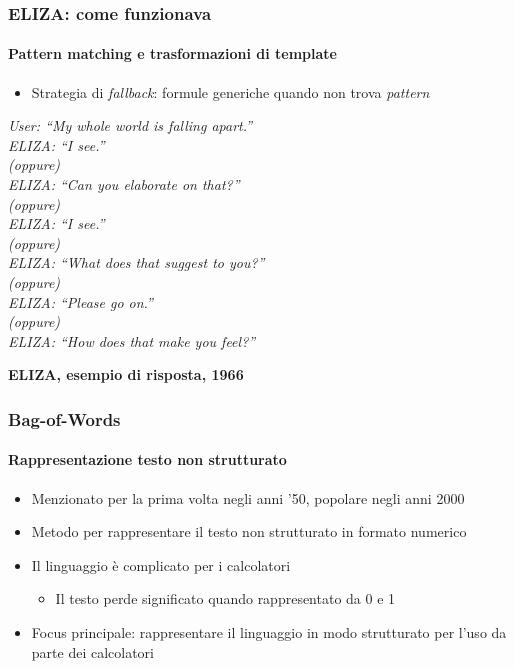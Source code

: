 \begin{frame}[t,fragile] \frametitle{ELIZA: come funzionava}
	\framesubtitle{Pattern matching e trasformazioni di template}
	{\small
		\begin{itemize}[leftmargin=10pt,align=right]
			\item[\alert{\faHandORight}] \alert{Strategia di \textit{fallback}:} formule generiche quando non trova \textit{pattern}
		\end{itemize}
		\vspace*{.3cm}
		\hspace*{4cm}
		\begin{minipage}[t]{.6\textwidth}
			\renewcommand{\epigraphsize}{\scriptsize}
			\setlength{\afterepigraphskip}{0pt}
			\setlength{\beforeepigraphskip}{5pt}
			\setlength{\epigraphwidth}{0.9\textwidth}
			\epigraph{\textit{\alert{User:} ``\alert{My} whole world is falling apart.''\\
			\alert{ELIZA:} ``I see.''\\
			(oppure)\\
			\alert{ELIZA:} ``Can you elaborate on that?''\\
			(oppure)\\
			\alert{ELIZA:} ``I see.''\\
			(oppure)\\
			\alert{ELIZA:} ``What does that suggest to you?''\\
			(oppure)\\
			\alert{ELIZA:} ``Please go on.''\\
			(oppure)\\
			\alert{ELIZA:} ``How does that make you feel?''
			}}{\textbf{ELIZA, esempio di risposta, 1966}}
		\end{minipage}
	}
\end{frame}
%
\begin{frame}[t,fragile] \frametitle{Bag-of-Words}
    \framesubtitle{Rappresentazione testo non strutturato}
	{\small
		\begin{minipage}[t]{\textwidth}
	    	\begin{itemize}[leftmargin=10pt,align=right]
				\onslide<1->\item[\alert{\faHandORight}] Menzionato per la prima volta negli anni '50, popolare negli anni 2000
				\onslide<2->\item[\alert{\faHandORight}] Metodo per rappresentare il testo \alert{non strutturato} in formato numerico
				\onslide<3->\item[\alert{\faHandORight}] Il \alert{linguaggio è complicato} per i calcolatori
				\begin{itemize}[leftmargin=10pt,align=right]
					\item[\alert{\faHandORight}] Il testo perde significato quando rappresentato da 0 e 1
				\end{itemize}
				\item[\alert{\faHandORight}] \alert{Focus principale:} rappresentare il linguaggio in \alert{modo strutturato} per l'uso da parte dei calcolatori
			\end{itemize}
        \end{minipage}
	}
\end{frame}
